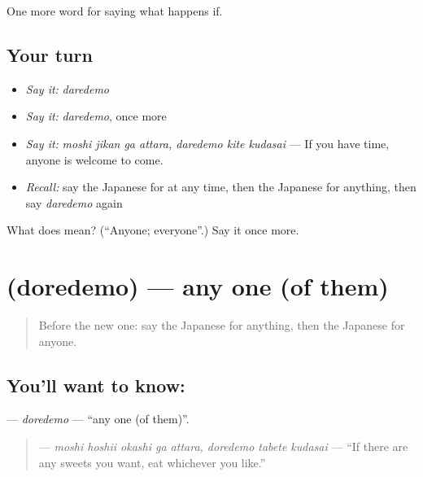 \begin{grammarlens}[title={What you've built}]
One more word for saying what happens if.
\end{grammarlens}

\subsection*{Your turn}
\begin{itemize}
\raggedright
  \item \emph{Say it:} \emph{daredemo}
  \item \emph{Say it:} \emph{daredemo}, once more
  \item \emph{Say it:} \emph{moshi jikan ga attara, daredemo kite kudasai} — If you have time, anyone is welcome to come.
  \item \emph{Recall:} say the Japanese for at any time, then the Japanese for anything, then say \emph{daredemo} again
\end{itemize}

\begin{tcolorbox}[breakable,colback=teal!4,colframe=teal!35!black,title={Before you move on}]
What does  mean? (\textquotedblleft{}Anyone; everyone\textquotedblright{}.) Say it once more.
\end{tcolorbox}
\section[\texorpdfstring{\ja{どれでも} (doredemo)}{どれでも (doredemo)}]{ (doredemo) — any one (of them)}

\label{lesson:JA-C523-doredemo}



\begin{quote}
Before the new one: say the Japanese for anything, then the Japanese for anyone.
\end{quote}

\subsection*{You'll want to know: }
\textbf{} — \emph{doredemo} — \textquotedblleft{}any one (of them)\textquotedblright{}.

\begin{quote}
\textbf{     } — \emph{moshi hoshii okashi ga attara, doredemo tabete kudasai} — \textquotedblleft{}If there are any sweets you want, eat whichever you like.\textquotedblright{}
\end{quote}

